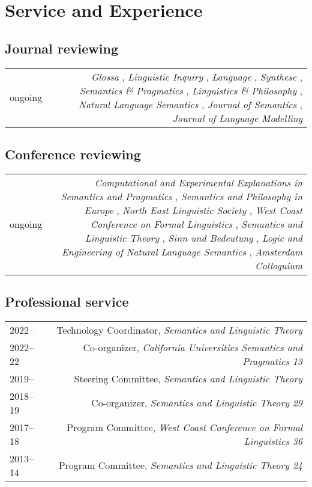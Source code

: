 \documentclass[12pt]{article}
\begin{document}
\medskip

\section*{Service and Experience}

\subsection*{Journal reviewing}

\begin{longtable}{LR}
  ongoing &
    \textit{Glossa}%
    ,
    \textit{Linguistic Inquiry}%
    ,
    \textit{Language}%
    ,
    \textit{Synthese}%
    ,
    \textit{Semantics \& Pragmatics}%
    ,
    \textit{Linguistics \& Philosophy}%
    ,
    \textit{Natural Language Semantics}%
    ,
    \textit{Journal of Semantics}%
    ,
    \textit{Journal of Language Modelling}%
\end{longtable}

\subsection*{Conference reviewing}

\begin{longtable}{LR}
  ongoing &
    \textit{Computational and Experimental Explanations in Semantics and
             Pragmatics}%
    ,
    \textit{Semantics and Philosophy in Europe}%
    ,
    \textit{North East Linguistic Society}%
    ,
    \textit{West Coast Conference on Formal Linguistics}%
    ,
    \textit{Semantics and Linguistic Theory}%
    ,
    \textit{Sinn und Bedeutung}%
    ,
    \textit{Logic and Engineering of Natural Language Semantics}%
    ,
    \textit{Amsterdam Colloquium}%
\end{longtable}

\subsection*{Professional service}

\begin{longtable}{LR}
  2022--     & Technology Coordinator, \textit{Semantics and Linguistic Theory}\\
  2022--22   & Co-organizer, \textit{California Universities Semantics and
               Pragmatics 13}\\
  2019--     & Steering Committee, \textit{Semantics and Linguistic Theory}\\
  2018--19   & Co-organizer, \textit{Semantics and Linguistic Theory 29}\\
  2017--18   & Program Committee, \textit{West Coast Conference on Formal
               Linguistics 36}\\
  2013--14   & Program Committee, \textit{Semantics and Linguistic Theory 24}
\end{longtable}
\end{document}
